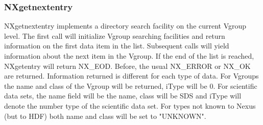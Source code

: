 \documentclass[12pt]{article}
\begin{document}
\subsubsection{NXgetnextentry}
NXgetnextentry  implements a directory search facility on the current Vgroup
level. The first call will initialize Vgroup searching facilities and return
information on the first data item in the list. Subsequent calls will yield
information about the next item in the Vgroup. If the end of the list is
reached, NXgetentry will return NX\_EOD. Before, the usual NX\_ERROR or NX\_OK
are returned. Information returned is different for each type of data. For
Vgroups the name and class of the Vgroup will be returned, iType will be 0.
For scientific data sets, the name field will be the name, class will be SDS
and iType will denote the number type of the scientific data set. For types
not known to Nexus (but to HDF) both name and class will be set to
"UNKNOWN". 
\end{document}
